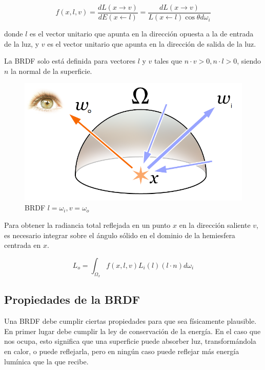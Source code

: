 \begin{equation}
f(x, l, v)=\frac{dL(x \to v)}{dE(x \gets l)} = \frac{dL(x \to v)}{L(x \gets l) \cos\theta d\omega_i} 
\end{equation}

donde $l$ es el vector unitario que apunta en la dirección opuesta a la de entrada de la luz, y $v$ es el vector unitario que apunta en la dirección de salida de la luz.

La BRDF solo está definida para vectores $l$ y $v$ tales que $n \cdot v > 0, n \cdot l > 0$, siendo $n$ la normal de la superficie.

\begin{figure}[h]
\centering
\includegraphics[scale=0.5]{Rendering_eq.png}
\caption{BRDF $l = \omega_i, v = \omega_o$ \cite{Timrb2008}}
\end{figure}


Para obtener la radiancia total reflejada en un punto $x$ en la dirección saliente $v$, es necesario integrar sobre el ángulo sólido en el dominio de la hemiesfera centrada en $x$.

\begin{equation}
\label{eq:radiance_integral}
L _ o = \int_{\Omega_x} f(x, l, v) L_i(l) (l \cdot n) d\omega_i 
\end{equation}

\clearpage

\subsection{Propiedades de la BRDF}

Una BRDF debe cumplir ciertas propiedades para que sea físicamente plausible.
En primer lugar debe cumplir la ley de conservación de la energía. En el caso que nos ocupa, esto significa que una superficie puede absorber luz, transformándola en calor, o puede reflejarla, pero en ningún caso puede reflejar más energía lumínica que la que recibe.

